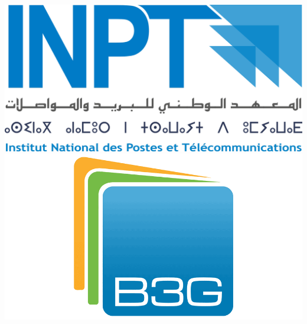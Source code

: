 
\thispagestyle{empty}
\includegraphics[scale=0.08]{Logos/Logo_INPT.png} 
         \hspace{11cm}  
\includegraphics[scale=0.1]{Logos/b3g-vector-logo.png}
        
